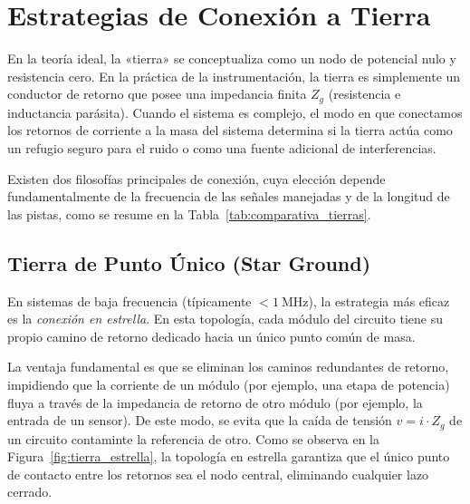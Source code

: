 \section{Estrategias de Conexión a Tierra}\label{sec:tierras}

En la teoría ideal, la «tierra» se conceptualiza como un nodo de potencial nulo y resistencia cero. En la práctica de la instrumentación, la tierra es simplemente un conductor de retorno que posee una impedancia finita $Z_g$ (resistencia e inductancia parásita). Cuando el sistema es complejo, el modo en que conectamos los retornos de corriente a la masa del sistema determina si la tierra actúa como un refugio seguro para el ruido o como una fuente adicional de interferencias.

Existen dos filosofías principales de conexión, cuya elección depende fundamentalmente de la frecuencia de las señales manejadas y de la longitud de las pistas, como se resume en la Tabla~\ref{tab:comparativa_tierras}.

\subsection{Tierra de Punto Único (Star Ground)}\label{sub:tierra_punto_unico}

En sistemas de baja frecuencia (típicamente $<\SI{1}{\mega\hertz}$), la estrategia más eficaz es la \emph{conexión en estrella}. En esta topología, cada módulo del circuito tiene su propio camino de retorno dedicado hacia un único punto común de masa. 

La ventaja fundamental es que se eliminan los caminos redundantes de retorno, impidiendo que la corriente de un módulo (por ejemplo, una etapa de potencia) fluya a través de la impedancia de retorno de otro módulo (por ejemplo, la entrada de un sensor). De este modo, se evita que la caída de tensión $v = i \cdot Z_g$ de un circuito contaminte la referencia de otro. Como se observa en la Figura~\ref{fig:tierra_estrella}, la topología en estrella garantiza que el único punto de contacto entre los retornos sea el nodo central, eliminando cualquier lazo cerrado.

